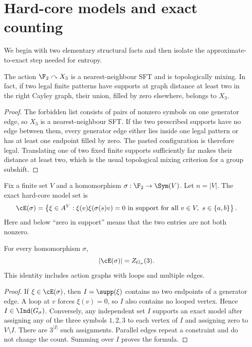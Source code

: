 \section{Hard-core models and exact counting}\label{sec:models}

We begin with two elementary structural facts and then isolate the
approximate-to-exact step needed for entropy.

\begin{proposition}\label{prop:mixing}
The action $\F_2\curvearrowright X_3$ is a nearest-neighbour SFT and is
topologically mixing.  In fact, if two legal finite patterns have supports at
graph distance at least two in the right Cayley graph, their union, filled by
zero elsewhere, belongs to $X_3$.
\end{proposition}

\begin{proof}
The forbidden list consists of pairs of nonzero symbols on one generator
edge, so $X_3$ is a nearest-neighbour SFT.  If the two prescribed supports
have no edge between them, every generator edge either lies inside one legal
pattern or has at least one endpoint filled by zero.  The pasted
configuration is therefore legal.  Translating one of two fixed finite
supports sufficiently far makes their distance at least two, which is the
usual topological mixing criterion for a group subshift.
\end{proof}

Fix a finite set $V$ and a homomorphism
$\sigma:\F_2\to\Sym(V)$.  Let $n=|V|$.  The exact hard-core model set is
\[
 \cE(\sigma)=\left\{\xi\in A^V:
 \xi(v)\xi(\sigma(s)v)=0 \text{ in support for all }
 v\in V,\ s\in\{a,b\}\right\}.
\]
Here and below ``zero in support'' means that the two entries are not both
nonzero.

\begin{lemma}\label{lem:exact}
For every homomorphism $\sigma$,
\[
 |\cE(\sigma)|=Z_{G_\sigma}(3).
\]
This identity includes action graphs with loops and multiple edges.
\end{lemma}

\begin{proof}
If $\xi\in\cE(\sigma)$, then $I=\supp(\xi)$ contains no two endpoints of a
generator edge.  A loop at $v$ forces $\xi(v)=0$, so $I$ also contains no
looped vertex.  Hence $I\in\Ind(G_\sigma)$.  Conversely, any independent set
$I$ supports an exact model after assigning any of the three symbols
$1,2,3$ to each vertex of $I$ and assigning zero to $V\setminus I$.  There
are $3^{|I|}$ such assignments.  Parallel edges repeat a constraint and do
not change the count.  Summing over $I$ proves the formula.
\end{proof}

